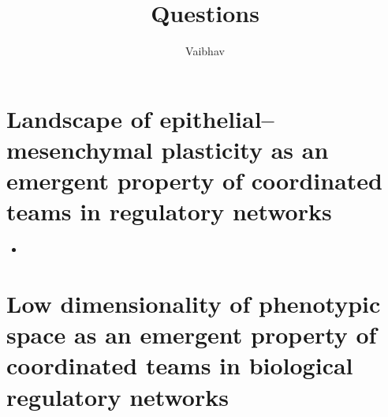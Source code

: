 \documentclass{article}
\title{Questions}
\author{Vaibhav}
\begin{document}
\maketitle

\section{Landscape of epithelial–mesenchymal
plasticity as an emergent
property of coordinated teams in
regulatory networks
}

\begin{itemize}

\item 

\end{itemize}

\section{Low dimensionality of phenotypic space as an emergent property of coordinated teams in biological regulatory networks}
\end{document}
